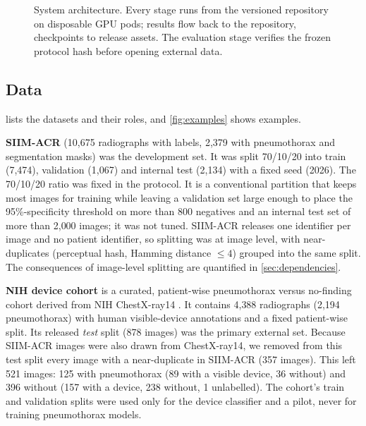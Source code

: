 \documentclass{ieeeaccess}
\begin{document}
\begin{figure}[!t]
\caption{System architecture. Every stage runs from the versioned repository on disposable GPU pods; results flow back to the repository, checkpoints to release assets. The evaluation stage verifies the frozen protocol hash before opening external data.}
\label{fig:system}
\end{figure}

\subsection{Data}
\label{sec:data}
 lists the datasets and their roles, and \cref{fig:examples} shows examples.

\textbf{SIIM-ACR} \cite{siim2019kaggle} (10{,}675 radiographs with labels, 2{,}379 with pneumothorax and segmentation masks) was the development set. It was split 70/10/20 into train (7{,}474), validation (1{,}067) and internal test (2{,}134) with a fixed seed (2026). The 70/10/20 ratio was fixed in the protocol. It is a conventional partition that keeps most images for training while leaving a validation set large enough to place the 95\%-specificity threshold on more than 800 negatives and an internal test set of more than 2{,}000 images; it was not tuned. SIIM-ACR releases one identifier per image and no patient identifier, so splitting was at image level, with near-duplicates (perceptual hash, Hamming distance $\le 4$) grouped into the same split. The consequences of image-level splitting are quantified in \cref{sec:dependencies}.

\textbf{NIH device cohort} \cite{zamora2026cohort} is a curated, patient-wise pneumothorax versus no-finding cohort derived from NIH ChestX-ray14 \cite{wang2017chestxray8}. It contains 4{,}388 radiographs (2{,}194 pneumothorax) with human visible-device annotations and a fixed patient-wise split. Its released \emph{test} split (878 images) was the primary external set. Because SIIM-ACR images were also drawn from ChestX-ray14, we removed from this test split every image with a near-duplicate in SIIM-ACR (357 images). This left 521 images: 125 with pneumothorax (89 with a visible device, 36 without) and 396 without (157 with a device, 238 without, 1 unlabelled). The cohort's train and validation splits were used only for the device classifier and a pilot, never for training pneumothorax models.
\end{document}
